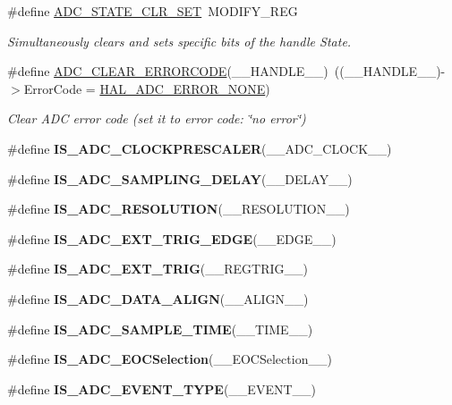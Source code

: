 \begin{DoxyCompactItemize}
\#define \mbox{\hyperlink{group___a_d_c___private___macros_gaaf93e91b164d4a220aae475eff82665f}{A\+D\+C\+\_\+\+S\+T\+A\+T\+E\+\_\+\+C\+L\+R\+\_\+\+S\+ET}}~M\+O\+D\+I\+F\+Y\+\_\+\+R\+EG
\begin{DoxyCompactList}\small\item\em Simultaneously clears and sets specific bits of the handle State. \end{DoxyCompactList}\item 
\#define \mbox{\hyperlink{group___a_d_c___private___macros_gac7ab87a3ab932eed1b3ac5faad4e3aa9}{A\+D\+C\+\_\+\+C\+L\+E\+A\+R\+\_\+\+E\+R\+R\+O\+R\+C\+O\+DE}}(\+\_\+\+\_\+\+H\+A\+N\+D\+L\+E\+\_\+\+\_\+)~((\+\_\+\+\_\+\+H\+A\+N\+D\+L\+E\+\_\+\+\_\+)-\/$>$Error\+Code = \mbox{\hyperlink{group___a_d_c___error___code_ga93b4576d46ee0f8c53b7d69f39778e38}{H\+A\+L\+\_\+\+A\+D\+C\+\_\+\+E\+R\+R\+O\+R\+\_\+\+N\+O\+NE}})
\begin{DoxyCompactList}\small\item\em Clear A\+DC error code (set it to error code\+: \char`\"{}no error\char`\"{}) \end{DoxyCompactList}\item 
\#define {\bfseries I\+S\+\_\+\+A\+D\+C\+\_\+\+C\+L\+O\+C\+K\+P\+R\+E\+S\+C\+A\+L\+ER}(\+\_\+\+\_\+\+A\+D\+C\+\_\+\+C\+L\+O\+C\+K\+\_\+\+\_\+)
\item 
\#define {\bfseries I\+S\+\_\+\+A\+D\+C\+\_\+\+S\+A\+M\+P\+L\+I\+N\+G\+\_\+\+D\+E\+L\+AY}(\+\_\+\+\_\+\+D\+E\+L\+A\+Y\+\_\+\+\_\+)
\item 
\#define {\bfseries I\+S\+\_\+\+A\+D\+C\+\_\+\+R\+E\+S\+O\+L\+U\+T\+I\+ON}(\+\_\+\+\_\+\+R\+E\+S\+O\+L\+U\+T\+I\+O\+N\+\_\+\+\_\+)
\item 
\#define {\bfseries I\+S\+\_\+\+A\+D\+C\+\_\+\+E\+X\+T\+\_\+\+T\+R\+I\+G\+\_\+\+E\+D\+GE}(\+\_\+\+\_\+\+E\+D\+G\+E\+\_\+\+\_\+)
\item 
\#define {\bfseries I\+S\+\_\+\+A\+D\+C\+\_\+\+E\+X\+T\+\_\+\+T\+R\+IG}(\+\_\+\+\_\+\+R\+E\+G\+T\+R\+I\+G\+\_\+\+\_\+)
\item 
\#define {\bfseries I\+S\+\_\+\+A\+D\+C\+\_\+\+D\+A\+T\+A\+\_\+\+A\+L\+I\+GN}(\+\_\+\+\_\+\+A\+L\+I\+G\+N\+\_\+\+\_\+)
\item 
\#define {\bfseries I\+S\+\_\+\+A\+D\+C\+\_\+\+S\+A\+M\+P\+L\+E\+\_\+\+T\+I\+ME}(\+\_\+\+\_\+\+T\+I\+M\+E\+\_\+\+\_\+)
\item 
\#define {\bfseries I\+S\+\_\+\+A\+D\+C\+\_\+\+E\+O\+C\+Selection}(\+\_\+\+\_\+\+E\+O\+C\+Selection\+\_\+\+\_\+)
\item 
\#define {\bfseries I\+S\+\_\+\+A\+D\+C\+\_\+\+E\+V\+E\+N\+T\+\_\+\+T\+Y\+PE}(\+\_\+\+\_\+\+E\+V\+E\+N\+T\+\_\+\+\_\+)

\end{DoxyCompactItemize}
